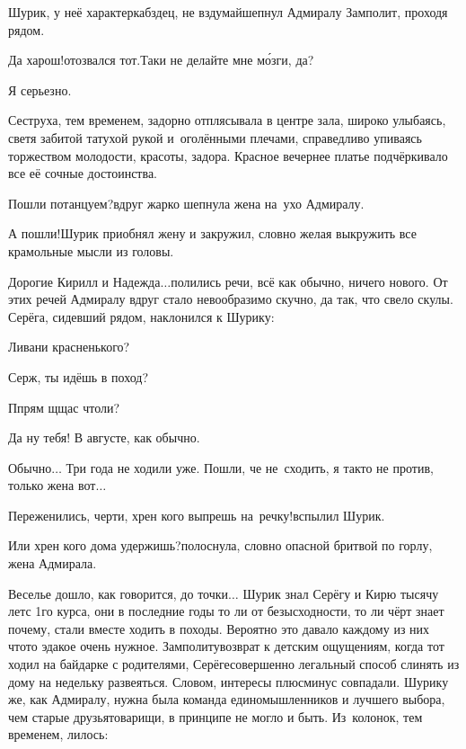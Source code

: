 {\diagdash Шурик, у неё характер\mdash кабздец, не вздумай\mdash шепнул Адмиралу Замполит, проходя рядом. 

\diagdash Да харош!\mdash отозвался тот.\mdash Таки не делайте мне м\'{о}зги, да?

\diagdash Я серьезно.

Сеструха, тем временем, задорно отплясывала в центре зала, широко улыбаясь, светя забитой татухой рукой и~оголёнными плечами, справедливо упиваясь торжеством молодости, красоты, задора. Красное вечернее платье подчёркивало все её сочные достоинства.

\diagdash Пошли потанцуем?\mdash вдруг жарко шепнула жена на~ухо Адмиралу.

\diagdash А пошли!\mdash Шурик приобнял жену и закружил, словно желая выкружить все крамольные мысли из головы. 

\diagdash Дорогие Кирилл и Надежда$\ldots$\mdash полились речи, всё как обычно, ничего нового. От этих речей Адмиралу вдруг стало невообразимо скучно, да так, что свело скулы. Серёга, сидевший рядом, наклонился к Шурику:

\diagdash Ливани красненького?

\diagdash Серж, ты идёшь в поход? 

\diagdash П\sdash прям щ\sdash щас чтоли?

\diagdash Да ну тебя! В августе, как обычно.

\diagdash Обычно$\ldots$ Три года не ходили уже. Пошли, че не~сходить, я так\sdash то не против, только жена вот$\ldots$

\diagdash Переженились, черти, хрен кого выпрешь на~речку!\mdash вспылил Шурик.

\diagdash Или хрен кого дома удержишь?\mdash полоснула, словно опасной бритвой по горлу, жена Адмирала. 

Веселье дошло, как говорится, до точки$\ldots$ Шурик знал Серёгу и Кирю тысячу лет\mdash с 1\sdash го курса, они в последние годы то ли от безысходности, то ли чёрт знает почему, стали вместе ходить в походы. Вероятно это давало каждому из них что\sdash то эдакое очень нужное. Замполиту\mdash возврат к детским ощущениям, когда тот ходил на байдарке с родителями, Серёге\mdash совершенно легальный способ слинять из дому на недельку развеяться. Словом, интересы плюс\sdash минус совпадали. Шурику же, как Адмиралу, нужна была команда единомышленников и лучшего выбора, чем старые друзья\sdash товарищи, в принципе не могло и быть. Из~колонок, тем временем, лилось:

}
